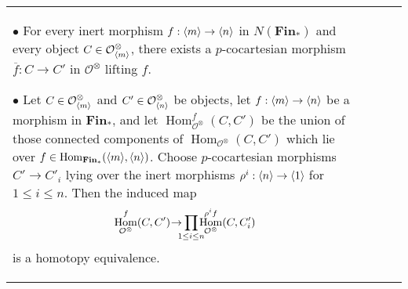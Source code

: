 \documentclass{article}
\DeclareMathOperator{\Hom}{Hom}
\begin{document}
\begin{centre}
\begin{longtable}{ |p{3.2cm}||p{5cm}|p{5.2cm}|p{5cm}|  }
\(\bullet\) For every inert morphism \(f : \langle m\rangle\to \langle n\rangle\) in \(N(\textbf{Fin}_*)\) and every object \(C\in \mathcal{O}^\otimes_{\langle m\rangle}\), there exists a \(p\)-cocartesian morphism \(\overline f : C \to C'\) in \(\mathcal{O}^\otimes\) lifting \(f\).

\(\bullet\) Let \(C \in \mathcal{O}^\otimes_{\langle m\rangle}\) and \(C'\in \mathcal{O}^\otimes_{\langle n\rangle}\) be objects, let \(f : \langle m\rangle\to \langle n\rangle\) be a morphism in \(\textbf{Fin}_*\), and let \(\Hom^f_{\mathcal{O}^\otimes}(C,C')\) be the union of those connected components of \(\Hom_{\mathcal{O}^\otimes}(C,C')\) which lie over \(f\in \Hom_{\textbf{Fin}_*}(\ang{m}, \ang{n})\). Choose \(p\)-cocartesian morphisms \(C' \to C'_i\) lying over the inert morphisms \(\rho^i : \langle n\rangle\to \langle1\rangle\) for \(1 \leq i \leq n\). Then the induced map
\[\Hom^f_{\mathcal{O}^\otimes}(C,C')\hspace{-0.5ex}\to\hspace{-1.5ex}\prod_{1\leq i\leq n}\hspace{-1.5ex}\Hom^{\rho^i f}_{\mathcal{O}^\otimes}(C,C_i')\]
is a homotopy equivalence.


\end{longtable}
\end{centre}
\end{document}
